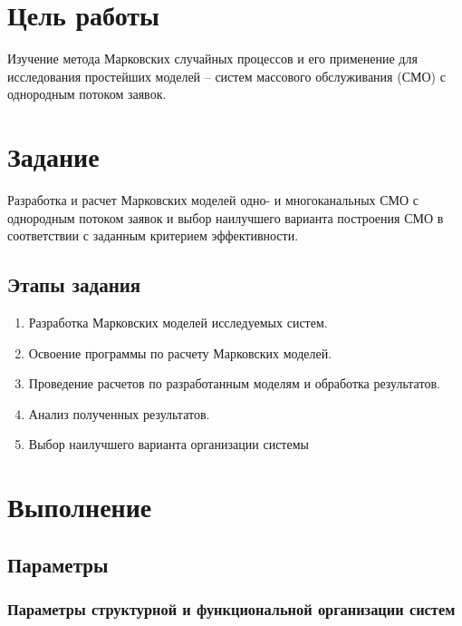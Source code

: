 

\usepackage{graphicx}
\usepackage{adjustbox}
\usepackage{multirow}

\def \labnum {1}
\def \labtype {Домашняя}
\def \labsubj {Моделирование}
\def \labauthor {Чебыкин И. Б.}
\def \labgroup {P3301}
\def \labinsp {Муравьева-Витковская Л. А.}
\def \labname {Вариант: 23/5}

\isnametrue
\lstset{
	caption=\lstname,
	basicstyle=\ttfamily\selectfont\scriptsize
}


\tableofcontents
\newpage
\section{Цель работы}
Изучение метода Марковских случайных процессов и его
применение для исследования простейших моделей – систем массового
обслуживания (СМО) с однородным потоком заявок.
\section{Задание}
Разработка и расчет Марковских моделей одно- и многоканальных
СМО с однородным потоком заявок и выбор наилучшего варианта
построения СМО в соответствии с заданным критерием эффективности.
\subsection{Этапы задания}
\begin{enumerate}
	\item Разработка Марковских моделей исследуемых систем.
	\item Освоение программы по расчету Марковских моделей.
	\item Проведение расчетов по разработанным моделям и обработка результатов.
	\item Анализ полученных результатов.
	\item Выбор наилучшего варианта организации системы
\end{enumerate}

\section{Выполнение}
\subsection{Параметры}

\subsubsection{Параметры структурной и функциональной организации систем}

